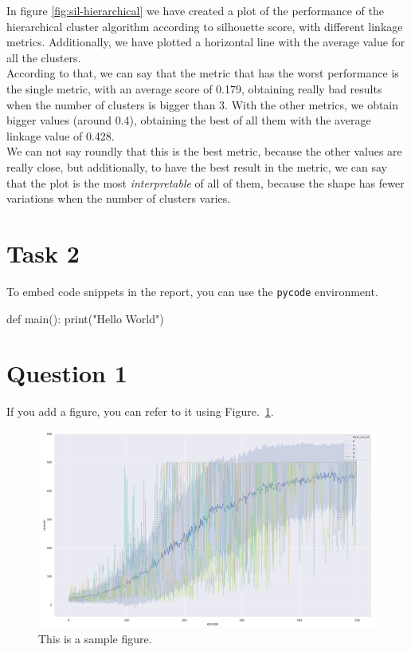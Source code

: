 \documentclass[12pt]{article}
\begin{document}
In figure \ref{fig:sil-hierarchical} we have created a plot of the performance of the hierarchical cluster algorithm according to silhouette score, with different linkage metrics. Additionally, we have plotted a horizontal line with the average value for all the clusters.\\

According to that, we can say that the metric that has the worst performance is the single metric, with an average score of 0.179, obtaining really bad results when the number of clusters is bigger than 3. With the other metrics, we obtain bigger values (around 0.4), obtaining the best of all them with the average linkage value of 0.428.\\ 

We can not say roundly that this is the best metric, because the other values are really close, but additionally, to have the best result in the metric, we can say that the plot is the most \textit{interpretable} of all of them, because the shape has fewer variations when the number of clusters varies.


\section{Task 2}
To embed code snippets in the report, you can use the \texttt{pycode} environment.

\begin{pycode}
def main():
    print("Hello World")
\end{pycode}

\section{Question 1}

If you add a figure, you can refer to it using Figure.~\ref*{fig:fig1}.

\begin{figure}[h] 
	\centering  %
    \includegraphics[width=0.3\columnwidth]{img/training.pdf}
	\caption{This is a sample figure.}
	\label{fig:fig1}
\end{figure}


\end{document}
